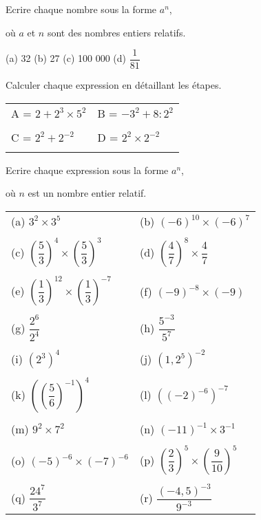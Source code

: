 \medskip
\begin{exercice}[]
Ecrire chaque nombre sous la forme $a^n$,

où $a$ et $n$ sont des nombres entiers relatifs.

(a) 32 \hspace{0.5cm} (b) 27 \hspace{0.5cm} (c) 100 000 \hspace{0.5cm} (d) $\dfrac{1}{81}$
\end{exercice}
\medskip
\begin{exercice}[]
Calculer chaque expression en détaillant les étapes.

\begin{tabular}{m{3.8cm}m{3.5cm}}
A = $2 + 2^3 \times 5^2$ & B = $-3^2 + 8 : 2^2$\\
&\\
C = $2^2 + 2^{-2}$ & D = $2^2 \times 2^{-2}$\\
&
\end{tabular}
\end{exercice}
\medskip
\begin{exercice}[]
Ecrire chaque expression sous la forme $a^n$,

où $n$ est un nombre entier relatif.

\renewcommand{\arraystretch}{0.8}
\begin{tabular}{p{4cm}p{4cm}}
(a) $3^2 \times 3^5$ & (b) $(-6)^{10} \times (-6)^7$\\
&\\
(c) $\left(\dfrac{5}{3}\right)^4 \times \left(\dfrac{5}{3}\right)^3$ & (d) $\left(\dfrac{4}{7}\right)^8 \times \dfrac{4}{7}$\\
&\\

(e) $\left(\dfrac{1}{3}\right)^{12} \times \left(\dfrac{1}{3}\right)^{-7}$ & (f) $(-9)^{-8} \times (-9)$\\
&\\
(g) $\dfrac{2^6}{2^4}$ & (h) $\dfrac{5^{-3}}{5^7}$\\
&\\

(i) $\left(2^3\right)^4$ & (j) $\left(1,2^5\right)^{-2}$\\
&\\
(k) $\left(\left(\dfrac{5}{6}\right)^{-1}\right)^4$ & (l) $\left(\left(-2\right)^{-6}\right)^{-7}$\\
&\\
(m) $9^2 \times 7^2$ & (n) $(-11)^{-1} \times 3^{-1}$\\
&\\
(o) $(-5)^{-6} \times (-7)^{-6}$ & (p) $\left(\dfrac{2}{3}\right)^5 \times \left(\dfrac{9}{10}\right)^5$\\
&\\
(q) $\dfrac{24^7}{3^7}$ & (r) $\dfrac{(-4,5)^{-3}}{9^{-3}}$\\
\end{tabular}
\end{exercice}
